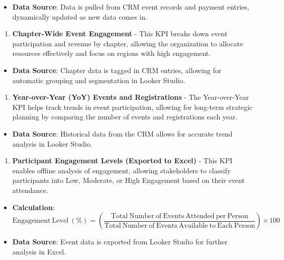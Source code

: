 \documentclass[11pt,a4paper,]{article}
\providecommand{\tightlist}{%
  \setlength{\itemsep}{0pt}\setlength{\parskip}{0pt}}
\begin{document}
\begin{itemize}
\tightlist
\item
  \textbf{Data Source}: Data is pulled from CRM event records and payment entries, dynamically updated as new data comes in.
\end{itemize}

\begin{enumerate}
\def\labelenumi{\arabic{enumi}.}
\setcounter{enumi}{11}
\tightlist
\item
  \textbf{Chapter-Wide Event Engagement} - This KPI breaks down event participation and revenue by chapter, allowing the organization to allocate resources effectively and focus on regions with high engagement.
\end{enumerate}

\begin{itemize}
\tightlist
\item
  \textbf{Data Source}: Chapter data is tagged in CRM entries, allowing for automatic grouping and segmentation in Looker Studio.
\end{itemize}

\begin{enumerate}
\def\labelenumi{\arabic{enumi}.}
\setcounter{enumi}{12}
\tightlist
\item
  \textbf{Year-over-Year (YoY) Events and Registrations} - The Year-over-Year KPI helps track trends in event participation, allowing for long-term strategic planning by comparing the number of events and registrations each year.
\end{enumerate}

\begin{itemize}
\tightlist
\item
  \textbf{Data Source}: Historical data from the CRM allows for accurate trend analysis in Looker Studio.
\end{itemize}

\begin{enumerate}
\def\labelenumi{\arabic{enumi}.}
\setcounter{enumi}{13}
\tightlist
\item
  \textbf{Participant Engagement Levels (Exported to Excel)} - This KPI enables offline analysis of engagement, allowing stakeholders to classify participants into Low, Moderate, or High Engagement based on their event attendance.
\end{enumerate}

\begin{itemize}
\item
  \textbf{Calculation}:
  \[
  \mathrm{Engagement\ Level\ (\%)} = \left( \textstyle \frac{\mathrm{Total\ Number\ of\ Events\ Attended\ per\ Person}}{\mathrm{Total\ Number\ of\ Events\ Available\ to\ Each\ Person}} \right) \times 100
  \]
\item
  \textbf{Data Source}: Event data is exported from Looker Studio for further analysis in Excel.
\end{itemize}
\end{document}
